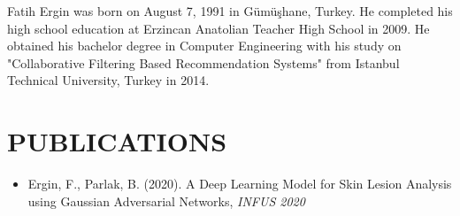 \curriculumvitae
\label{chapter:vita}

Fatih Ergin was born on August 7, 1991 in Gümüşhane, Turkey.
He completed his high school education at Erzincan Anatolian Teacher High School in 2009.
He obtained his bachelor degree in Computer Engineering with his study on
"Collaborative Filtering Based Recommendation Systems" from Istanbul Technical University, Turkey in 2014.


\section*{\uppercase{Publications}}

    \begin{itemize}
        \item[] Ergin, F., Parlak, B. (2020). A Deep Learning Model for Skin Lesion Analysis using Gaussian Adversarial Networks, \emph{INFUS 2020}
    \end{itemize}